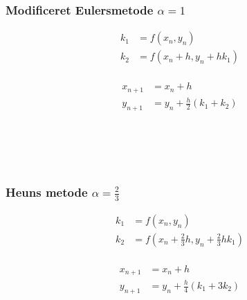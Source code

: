 \begin{frame}
\frametitle{Modificeret Eulersmetode $\alpha = 1$}  
\begin{minipage}[t]{0.31\textwidth}
\begin{align*}
k_1 & = f(x_n , y_n) \\
k_2 & = f( x_n + h , y_n  + h k_1 ) \\
\end{align*}
%
\end{minipage} 
\phantom{Hej}
\begin{minipage}[t]{0.31\textwidth}
\begin{align*}
x_{n+1} & = x_n+h \\
y_{n+1} & = y_n + \frac{h}{2} (k_1 + k_2 ) \\
\end{align*}
%
\end{minipage} 
\\

\\
\phantom{H}
\\
%
\end{frame}
%
%
\begin{frame}
\frametitle{Heuns metode $\alpha = \frac{2}{3}$ }
\begin{minipage}[t]{0.31\textwidth}
\begin{align*}
k_1 & = f(x_n , y_n) \\
k_2 & = f \left( x_n + \frac{2}{3} h , y_n  + \frac{2}{3} h k_1 \right) \\
\end{align*}
%
\end{minipage} 
\phantom{Hej}
\begin{minipage}[t]{0.31\textwidth}
\begin{align*}
x_{n+1} & = x_n+h \\
y_{n+1} & = y_n + \frac{h}{4} (k_1 + 3k_2 )  \\
\end{align*}
%
\end{minipage} 
\\

\\
\phantom{H}
\\
\end{frame}